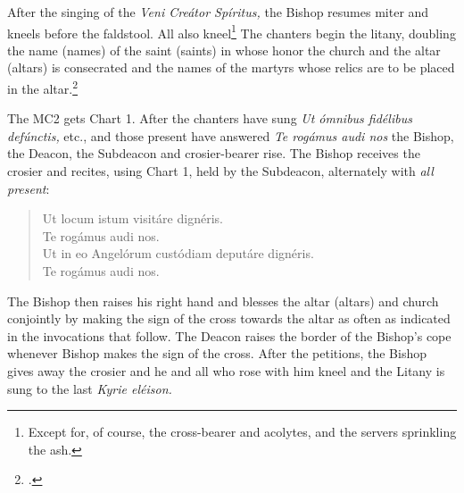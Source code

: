 \documentclass[letterpaper]{report}
\begin{document}
{    \rubric After the singing of the \textit{Veni Cre\'ator Sp\'iritus,} the
    Bishop resumes miter and kneels before the faldstool. All also
    kneel\footnote{Except for, of course, the cross-bearer and acolytes, and
    the servers sprinkling the ash.} The chanters begin the litany, doubling
    the name (names) of the saint (saints) in whose honor the church and the
    altar (altars) is consecrated and the names of the martyrs whose relics are
    to be placed in the altar.\footcite[If the name of any of these saints is
    inscried in the litany, e.g., St. Peter, St. Stephen, it is invoked a
    second time immediately after the proper invocation in the Litany. If the
    name is not in the Litany, it is inserted after the \textit{individual}
    invocations of the saints of the same category, but before the general
    invocation, e.g., if the church is consecrated in honor of St. Francis de
    Sales, his name is inserted twice after \textit{Sancte Nicol\ae} and before
    \textit{Omnes sancti Pontifices et Confessores.} If the church or altar is
    consecrated in honor of the Blessed Virgin under any title whatever the
    invocation \textit{Sancta Maria} is mentioned twice; if in honor of a
    mystery of the Life and Passion of Our Lord, the petition \textit{Fili
    Redemptor mundi Deus} is repeated.][Note, p. 51.]{consecranda}

    \rubric The MC2 gets Chart 1. After the chanters have sung \textit{Ut
    \'omnibus fid\'elibus def\'unctis,} etc., and those present have answered
    \textit{Te rog\'amus audi nos} the Bishop, the Deacon, the Subdeacon and
    crosier-bearer rise. The Bishop receives the crosier and recites, using
    Chart 1, held by the Subdeacon, alternately with \textit{all present}:

    \begin{quote}
        \vbar Ut locum istum visitáre dignéris.\\
        \rbar Te rogámus audi nos.\\
        \vbar Ut in eo Angelórum custódiam deputáre dignéris.\\
        \rbar Te rogámus audi nos.\\
    \end{quote}

    The Bishop then raises his right hand and blesses the altar (altars) and church
    conjointly by making the sign of the cross towards the altar as often as
    indicated in the invocations that follow. The Deacon raises the border of the
    Bishop's cope whenever Bishop makes the sign of the cross. After the petitions,
    the Bishop gives away the crosier and he and all who rose with him kneel and
    the Litany is sung to the last \textit{Kyrie el\'eison.}

}
\end{document}
